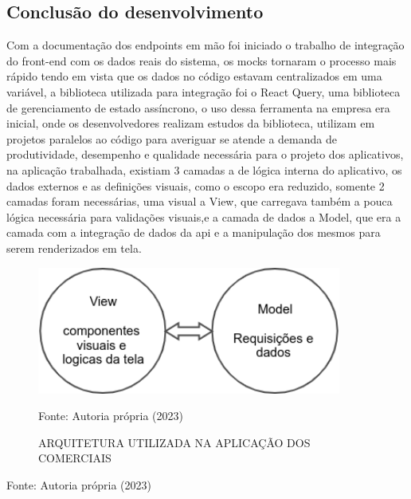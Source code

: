 \documentclass{ufersa}
\begin{document}
\subsection{Conclusão do desenvolvimento}
Com a documentação dos endpoints em mão foi iniciado o trabalho de integração do front-end com os dados reais do sistema, os mocks tornaram o processo mais rápido tendo em vista que os dados no código estavam centralizados em uma variável, a biblioteca utilizada para integração foi o React Query, uma biblioteca de gerenciamento de estado assíncrono, o uso dessa ferramenta na empresa era inicial, onde os desenvolvedores realizam estudos da biblioteca, utilizam em projetos paralelos ao código para averiguar se atende a demanda de produtividade, desempenho e qualidade necessária para o projeto dos aplicativos, na aplicação trabalhada, existiam 3 camadas a de lógica interna do aplicativo, os dados externos e as definições visuais, como o escopo era reduzido, somente 2 camadas foram necessárias, uma visual a View, que carregava também a pouca lógica necessária para validações visuais,e a camada de dados a Model, que era a camada com a integração de dados da api e a manipulação dos mesmos para serem renderizados em tela.

\begin{figure}[h]
\centering 
\caption{ARQUITETURA UTILIZADA NA APLICAÇÃO DOS COMERCIAIS}
\hspace*{-1.5in}

\includegraphics[width=10cm]{assets/arquiteturaSimples.png} 

Fonte: Autoria própria (2023)
\end{figure}


Fonte: Autoria própria (2023)
\end{document}
